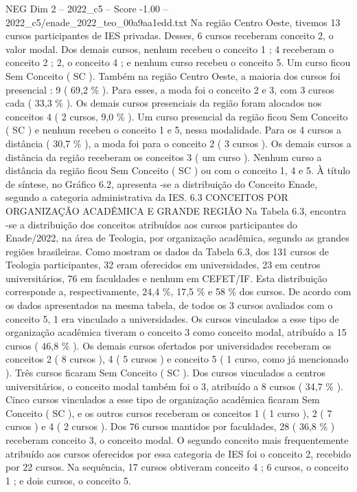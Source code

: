 \begin{textsample}{NEG Dim 2 – 2022\_c5 – Score -1.00 – 2022\_c5/enade\_2022\_teo\_00a9aa1edd.txt}
Na região Centro Oeste, tivemos 13 cursos participantes de IES privadas.
Desses, 6 cursos receberam conceito 2, o valor modal.
Dos demais cursos, nenhum recebeu o conceito 1 ; 4 receberam o conceito 2 ; 2, o conceito 4 ; e nenhum curso recebeu o conceito 5.
Um curso ficou Sem Conceito ( SC ).
Também na região Centro Oeste, a maioria dos cursos foi presencial : 9 ( 69,2 \% ).
Para esses, a moda foi o conceito 2 e 3, com 3 cursos cada ( 33,3 \% ).
Os demais cursos presenciais da região foram alocados nos conceitos 4 ( 2 cursos, 9,0 \% ).
Um curso presencial da região ficou Sem Conceito ( SC ) e nenhum recebeu o conceito 1 e 5, nessa modalidade.
Para os 4 cursos a distância ( 30,7 \% ), a moda foi para o conceito 2 ( 3 cursos ).
Os demais cursos a distância da região receberam os conceitos 3 ( um curso ).
Nenhum curso a distância da região ficou Sem Conceito ( SC ) ou com o conceito 1, 4 e 5.
À título de síntese, no Gráfico 6.2, apresenta -se a distribuição do Conceito Enade, segundo a categoria administrativa da IES. 6.3 CONCEITOS POR ORGANIZAÇÃO ACADÊMICA E GRANDE REGIÃO Na Tabela 6.3, encontra -se a distribuição dos conceitos atribuídos aos cursos participantes do Enade/2022, na área de Teologia, por organização acadêmica, segundo as grandes regiões brasileiras.
Como mostram os dados da Tabela 6.3, dos 131 cursos de Teologia participantes, 32 eram oferecidos em universidades, 23 em centros universitários, 76 em faculdades e nenhum em CEFET/IF.
Esta distribuição corresponde a, respectivamente, 24,4 \%, 17,5 \% e 58 \% dos cursos.
De acordo com os dados apresentados na mesma tabela, de todos os 3 cursos avaliados com o conceito 5, 1 era vinculado a universidades.
Os cursos vinculados a esse tipo de organização acadêmica tiveram o conceito 3 como conceito modal, atribuído a 15 cursos ( 46,8 \% ).
Os demais cursos ofertados por universidades receberam os conceitos 2 ( 8 cursos ), 4 ( 5 cursos ) e conceito 5 ( 1 curso, como já mencionado ).
Três cursos ficaram Sem Conceito ( SC ).
Dos cursos vinculados a centros universitários, o conceito modal também foi o 3, atribuído a 8 cursos ( 34,7 \% ).
Cinco cursos vinculados a esse tipo de organização acadêmica ficaram Sem Conceito ( SC ), e os outros cursos receberam os conceitos 1 ( 1 curso ), 2 ( 7 cursos ) e 4 ( 2 cursos ).
Dos 76 cursos mantidos por faculdades, 28 ( 36,8 \% ) receberam conceito 3, o conceito modal.
O segundo conceito mais frequentemente atribuído aos cursos oferecidos por essa categoria de IES foi o conceito 2, recebido por 22 cursos.
Na sequência, 17 cursos obtiveram conceito 4 ; 6 cursos, o conceito 1 ; e dois cursos, o conceito 5.

\end{textsample}
